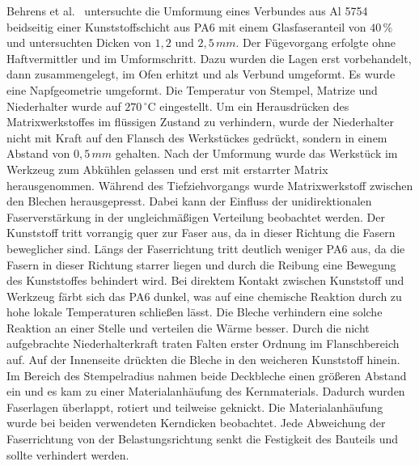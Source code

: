 Behrens et al.~\cite{Behrens.2014} untersuchte die Umformung eines Verbundes aus Al 5754 beidseitig einer Kunststoffschicht aus PA6 mit einem Glasfaseranteil von $40\,\%$ und untersuchten Dicken von $1,2$ und $2,5 \, mm$.
Der Fügevorgang erfolgte ohne Haftvermittler und im Umformschritt.
Dazu wurden die Lagen erst vorbehandelt, dann zusammengelegt, im Ofen erhitzt und als Verbund umgeformt.
Es wurde eine Napfgeometrie umgeformt.
Die Temperatur von Stempel, Matrize und Niederhalter wurde auf $270 \, ^\circ \text{C}$ eingestellt.
Um ein Herausdrücken des Matrixwerkstoffes im flüssigen Zustand zu verhindern, wurde der Niederhalter nicht mit Kraft auf den Flansch des Werkstückes gedrückt, sondern in einem Abstand von $0,5\,mm$ gehalten.
Nach der Umformung wurde das Werkstück im Werkzeug zum Abkühlen gelassen und erst mit erstarrter Matrix herausgenommen.
Während des Tiefziehvorgangs wurde Matrixwerkstoff zwischen den Blechen herausgepresst.
Dabei kann der Einfluss der unidirektionalen Faserverstärkung in der ungleichmäßigen Verteilung beobachtet werden.
Der Kunststoff tritt vorrangig quer zur Faser aus, da in dieser Richtung die Fasern beweglicher sind.
Längs der Faserrichtung tritt deutlich weniger PA6 aus, da die Fasern in dieser Richtung starrer liegen und durch die Reibung eine Bewegung des Kunststoffes behindert wird.
Bei direktem Kontakt zwischen Kunststoff und Werkzeug färbt sich das PA6 dunkel, was auf eine chemische Reaktion durch zu hohe lokale Temperaturen schließen lässt.
Die Bleche verhindern eine solche Reaktion an einer Stelle und verteilen die Wärme besser.
Durch die nicht aufgebrachte Niederhalterkraft traten Falten erster Ordnung im Flanschbereich auf.
Auf der Innenseite drückten die Bleche in den weicheren Kunststoff hinein.
Im Bereich des Stempelradius nahmen beide Deckbleche einen größeren Abstand ein und es kam zu einer Materialanhäufung des Kernmaterials.
Dadurch wurden Faserlagen überlappt, rotiert und teilweise geknickt.
Die Materialanhäufung wurde bei beiden verwendeten Kerndicken beobachtet.
Jede Abweichung der Faserrichtung von der Belastungsrichtung senkt die Festigkeit des Bauteils und sollte verhindert werden.

